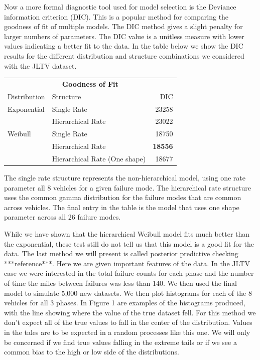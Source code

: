 \documentclass[12pt]{article}
\begin{document}
Now a more formal diagnostic tool used for model selection is the Deviance
information criterion (DIC).  This is a popular method for comparing the
goodness of fit of multiple models.  The DIC method gives a slight penalty for
larger numbers of parameters.  The DIC value is a unitless measure with lower
values indicating a better fit to the data.  In the table below we show the DIC
results for the different distribution and structure combinations we considered
with the JLTV dataset.

\begin{tabular}{|l|l|r|}
\multicolumn{3}{c}{\textbf{Goodness of Fit}} \\
\cline{1-3}
Distribution    & Structure & DIC \\
\hline
Exponential   & Single Rate                       & 23258               \\
              & Hierarchical Rate                 & 23022               \\
Weibull       & Single Rate                       & 18750               \\
              & Hierarchical Rate                 & \textbf{18556}      \\
              & Hierarchical Rate (One shape)     & 18677               \\
\hline
\end{tabular}

The single rate structure represents the non-hierarchical model, using one rate
parameter all 8 vehicles for a given failure mode.  The hierarchical rate
structure uses the common gamma distribution for the failure modes that are
common across vehicles.  The final entry in the table is the model that uses one
shape parameter across all 26 failure modes.

While we have shown that the hierarchical Weibull model fits much better than
the exponential, these test still do not tell us that this model is a good fit
for the data.  The last method we will present is called posterior predictive
checking ***reference***.  Here we are given important features of the data.
In the JLTV case we were interested in the total failure counts for each phase
and the number of time the miles between failures was less than 140.  We then
used the final model to simulate 5,000 new datasets.  We then plot histograms
for each of the 8 vehicles for all 3 phases.  In Figure 1 are examples of the
histograms produced, with the line showing where the value of the true dataset
fell.  For this method we don’t expect all of the true values to fall in the
center of the distribution.  Values in the tales are to be expected in a random
processes like this one.  We will only be concerned if we find true values
falling in the extreme tails or if we see a common bias to the high or low side
of the distributions.
\end{document}
